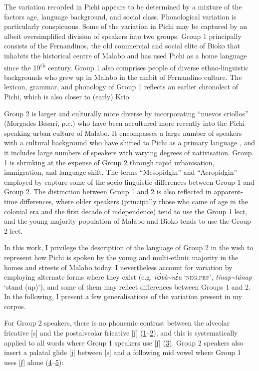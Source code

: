 The variation recorded in Pichi appears to be determined by a mixture of the factors age, language background, and social class. Phonological variation is particularly conspicuous. Some of the variation in Pichi may be captured by an albeit oversimplified division of speakers into two groups. Group 1 principally consists of the Fernandinos, the old commercial and social elite of Bioko \citep{Lynn1984} that inhabits the historical centre of Malabo and has used Pichi as a home language since the 19\textsuperscript{th} century. Group 1 also comprises people of diverse ethno-linguistic backgrounds who grew up in Malabo in the ambit of Fernandino culture. The lexicon, grammar, and phonology of Group 1 reflects an earlier chronolect of Pichi, which is also closer to (early) Krio. 

Group 2 is larger and culturally more diverse by incorporating “nuevos criollos” (Morgades Besari, p.c.) who have been accultured more recently into the Pichi-speaking urban culture of Malabo. It encompasses a large number of speakers with a  cultural background who have shifted to Pichi as a primary language \citep{BolekiaBoleká2007}, and it includes large numbers of speakers with varying degrees of nativisation. Group 1 is shrinking at the expense of Group 2 through rapid urbanisation, immigration, and language shift. The terms “Mesopidgin” and “Acropidgin” employed by \citet{MorgadesBesari2011} capture some of the socio-linguistic differences between Group 1 and Group 2. The distinction between Group 1 and 2 is also reflected in apparent-time differences, where older speakers (principally those who came of age in the colonial era and the first decade of independence) tend to use the Group 1 lect, and the young majority population of Malabo and Bioko tends to use the Group 2 lect. 

In this work, I privilege the description of the language of Group 2 in the wish to represent how Pichi is spoken by the young and multi-ethnic majority in the homes and streets of Malabo today. I nevertheless account for variation by employing alternate forms where they exist (e.g. \textit{nɔ́bà{\textasciitilde}nɛ́a} ‘\textsc{neg.prf}’, \textit{tínap{\textasciitilde}tánap} ‘stand (up)’), and some of them may reflect differences between Groups 1 and 2. In the following, I present a few generalisations of the variation present in my corpus. 

For Group 2 speakers, there is no phonemic contrast between the alveolar fricative [s] and the postalveolar fricative [ʃ] (\hyperref[ex:0.1]{1}--\hyperref[ex:0.1.1]{2}), and this is systematically applied to all words where Group 1 speakers use [ʃ] (\hyperref[ex:0.2]{3}). Group 2 speakers also insert a palatal glide [j] between [s] and a following mid vowel where Group 1 uses [ʃ] alone (\hyperref[ex:0.3]{4}--\hyperref[ex:0.4]{5}):



